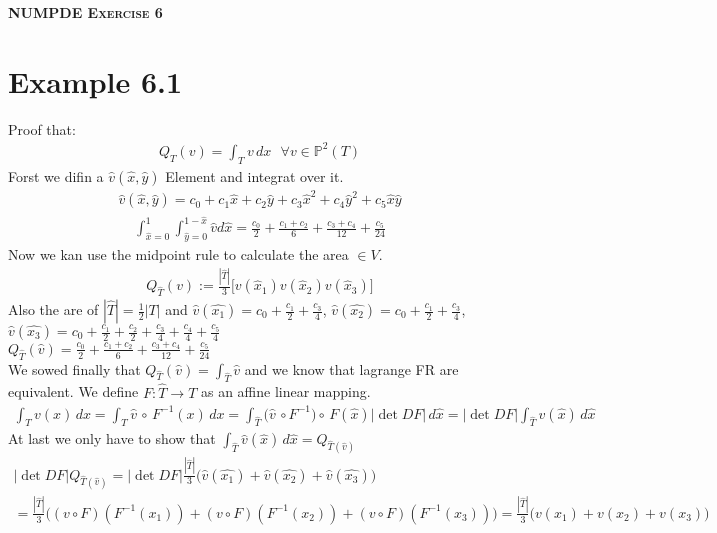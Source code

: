 \documentclass[11pt,a4paper]{article}
\begin{document}
\begin{center}
    \fontsize{24pt}{10pt}\selectfont
    \textsc{\textbf{NUMPDE Exercise 6}}
\end{center}
\section{Example 6.1}
Proof that:
\begin{align*}
Q_T(v) = \int_T v\,dx\,\,\,\, \forall v \in \mathbb{P}^2(T)
\end{align*}
Forst we difin a $\hat{v}(\hat{x},\hat{y})$ Element and integrat over it. 
\begin{align*}
\hat{v}(\hat{x},\hat{y}) = c_0+c_1\hat{x}+c_2\hat{y}+c_3\hat{x}^2+c_4\hat{y}^2+c_5\hat{x}\hat{y}
\end{align*}
\begin{align*}
\int_{\hat{x}=0}^1\int_{\hat{y}=0}^{1-\hat{x}}\hat{v}d\hat{x} = \frac{c_0}{2}+\frac{c_1+c_2}{6}+\frac{c_3+c_4}{12}+\frac{c_5}{24}
\end{align*}
Now we kan use the midpoint rule to calculate the area $\in V$.
\begin{align*}
Q_{\hat{T}}(v) := \frac{|\hat{T}|}{3}\big[v(\hat{x}_1)v(\hat{x}_2)v(\hat{x}_3)\big]
\end{align*}
Also the are of $|\hat{T}| = \frac{1}{2}|T|$ and $\hat{v}(\hat{x_1}) = c_0+\frac{c_1}{2}+\frac{c_3}{4}$,
$\hat{v}(\hat{x_2}) =c_0+\frac{c_1}{2}+\frac{c_3}{4}$,
$\hat{v}(\hat{x_3}) = c_0+\frac{c_1}{2}+\frac{c_2}{2}+\frac{c_3}{4}+\frac{c_4}{4}+\frac{c_5}{4}$\\
$Q_{\hat{T}}(\hat{v}) = \frac{c_0}{2}+\frac{c_1+c_2}{6}+\frac{c_3+c_4}{12}+\frac{c_5}{24}$\\
We sowed finally that $Q_{\hat{T}}(\hat{v}) = \int_{\hat{T}}\hat{v}$ and we know that lagrange FR are equivalent. We define $F: \hat{T} \to T$ as an affine linear mapping.
\begin{align*}
\int_{T}v(x)\, dx  = \int_T\hat{v}\, \circ\, F^{-1}(x)\,dx = \int_{\hat{T}}\Big(\hat{v}\,\circ F^{-1}\Big)\circ\,F(\hat{x})|\det DF|\,d\hat{x}=|\det DF|\int_{\hat{T}}\hat{v}(\hat{x})\,d\hat{x}
\end{align*}
At last we only have to show that $\int_{\hat{T}}\hat{v}(\hat{x})\,d\hat{x} = Q_{\hat{T}(\hat{v})}$
\begin{align*}
|\det DF|Q_{\hat{T}(\hat{v})} = |\det DF|\frac{|\hat{T}|}{3}\Big(\hat{v}(\hat{x_1})+\hat{v}(\hat{x_2})+\hat{v}(\hat{x_3})\Big)\\ =
\frac{|\hat{T}|}{3} \Bigg((v\circ F)(F^{-1}(x_1))+(v\circ F)(F^{-1}(x_2))+(v\circ F)(F^{-1}(x_3))\Bigg) = \frac{|\hat{T}|}{3}\Big(v(x_1)+v(x_2)+v(x_3)\Big)
\end{align*}
\end{document}
